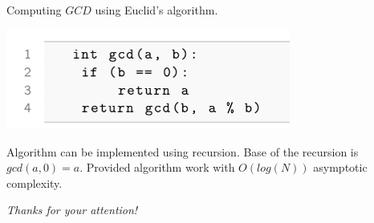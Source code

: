 \documentclass{beamer}
\begin{document}
    \begin{frame}{Computing $GCD$ using Euclid's algorithm. }
        
        \includegraphics[width=0.7\textwidth]{images/lecture_2/gcd.png}

        Algorithm can be implemented using recursion. Base of the recursion is $gcd(a, 0) = a$.
        Provided algorithm work with $O(log(N))$ asymptotic complexity.
        
    \end{frame}




    \begin{frame}{}
        \centering \Large
        \emph{Thanks for your attention!}
      \end{frame}
\end{document}
